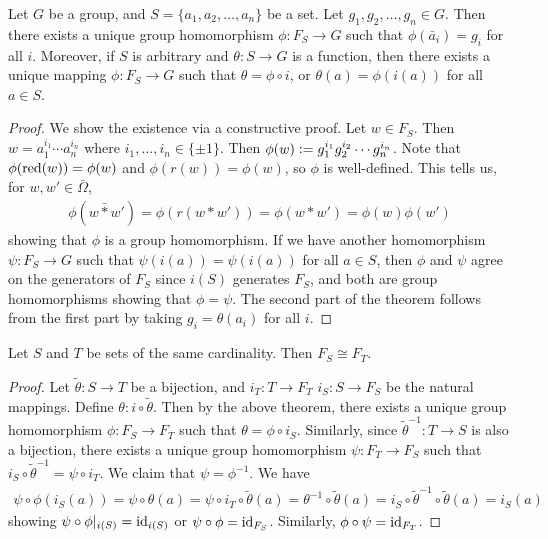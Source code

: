 \begin{theorem}
    Let $G$ be a group, and $S = \{a_{1},a_{2},\ldots,a_{n}\}$ be a set. Let $g_{1},g_{2},\ldots,g_{n} \in G$. Then there exists a unique group homomorphism $\phi:F_{S} \to G$ such that $\phi(\bar{a}_{i}) = g_{i}$ for all $i$. Moreover, if $S$ is arbitrary and $\theta:S \to G$ is a function, then there exists a unique mapping $\phi:F_{S} \to G$ such that $\theta = \phi \circ i$, or $\theta(a) = \phi(i(a))$ for all $a \in S$.
\end{theorem}
\begin{proof}
    We show the existence via a constructive proof. Let $w \in F_{S}$. Then $w = a_{1}^{i_{1}} \cdots a_{n}^{i_{n}}$ where $i_{1},\ldots,i_{n} \in \{\pm 1\}$. Then $\phi(w) \vcentcolon= g_{1}^{i_{1}} g_{2}^{i_{2}} \cdots g_{n}^{i_{n}}$. Note that $\phi(\operatorname{red}(w)) = \phi(w)$ and $\phi(r(w)) = \phi(w)$, so $\phi$ is well-defined. This tells us, for $w,w' \in \bar{\Omega}$,
    \begin{align}
        \phi(w \bar{\ast} w') = \phi(r(w \ast w')) = \phi(w \ast w') = \phi(w) \phi(w')
    \end{align}
    showing that $\phi$ is a group homomorphism. If we have another homomorphism $\psi:F_{S} \to G$ such that $\psi(i(a)) = \psi(i(a))$ for all $a \in S$, then $\phi$ and $\psi$ agree on the generators of $F_{S}$ since $i(S)$ generates $F_{S}$, and both are group homomorphisms showing that $\phi = \psi$. The second part of the theorem follows from the first part by taking $g_{i} = \theta(a_{i})$ for all $i$.
\end{proof}

\begin{proposition}
    Let $S$ and $T$ be sets of the same cardinality. Then $F_{S} \cong F_{T}$.
\end{proposition}

\begin{proof}
    Let $\tilde{\theta}:S \to T$ be a bijection, and $i_{T} :T \to F_{T}$ $i_{S}:S \to F_{S}$ be the natural mappings. Define $\theta:i \circ \tilde{\theta}$. Then by the above theorem, there exists a unique group homomorphism $\phi:F_{S} \to F_{T}$ such that $\theta = \phi \circ i_{S}$. Similarly, since $\tilde{\theta}^{-1}:T \to S$ is also a bijection, there exists a unique group homomorphism $\psi:F_{T} \to F_{S}$ such that $i_{S} \circ \tilde{\theta}^{-1} = \psi \circ i_{T}$. We claim that $\psi = \phi^{-1}$. We have
    \begin{align}
        \psi \circ \phi(i_{S}(a)) = \psi \circ \theta (a) = \psi \circ i_{T} \circ \tilde{\theta}(a) = \theta^{-1} \circ \tilde{\theta}(a) = i_{S} \circ \tilde{\theta}^{-1} \circ \tilde{\theta}(a) = i_{S}(a)
    \end{align}
    showing $\psi \circ \phi|_{i(S)} = \operatorname{id}_{i(S)}$ or $\psi \circ \phi = \operatorname{id}_{F_{S}}$. Similarly, $\phi \circ \psi = \operatorname{id}_{F_{T}}$.
\end{proof}

